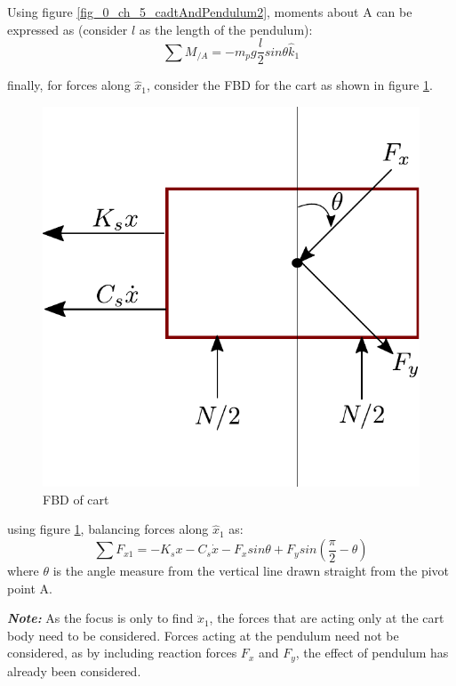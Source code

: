 Using figure \ref{fig_0_ch_5_cadtAndPendulum2}, moments about A can be expressed as (consider $l$ as the length of the pendulum):
\begin{equation}
	\sum M_{/A} = -m_{p} g \frac{l}{2} sin\theta \hat{k}_{1}
\end{equation}

finally, for forces along $\hat{x}_{1}$, consider the FBD for the cart as shown in figure \ref{fig_0_ch_5_cadtAndPendulum3}.
\begin{figure}[h!]
	\centering
	\includegraphics[width=0.35\linewidth]{Bilder/28_CartWithPendulum_FBD_Cart.pdf}
	\caption{FBD of cart}
	\label{fig_0_ch_5_cadtAndPendulum3}
\end{figure}
using figure \ref{fig_0_ch_5_cadtAndPendulum3}, balancing forces along $\hat{x}_{1}$ as:
\begin{equation} \label{eq_0ch_5_toBeAdded1}
	\sum F_{x1} = -K_{s}x - C_{s}\dot{x} - F_{x} sin\theta + F_{y} sin(\frac{\pi}{2} - \theta)
\end{equation}
where $\theta$ is the angle measure from the vertical line drawn straight from the pivot point A.

\textbf{\textit{Note: }}As the focus is only to find $\ddot{x}_{1}$, the forces that are acting only at the cart body need to be considered. Forces acting at the pendulum need not be considered, as by including reaction forces $F_{x}$ and $F_{y}$, the effect of pendulum has already been considered.

